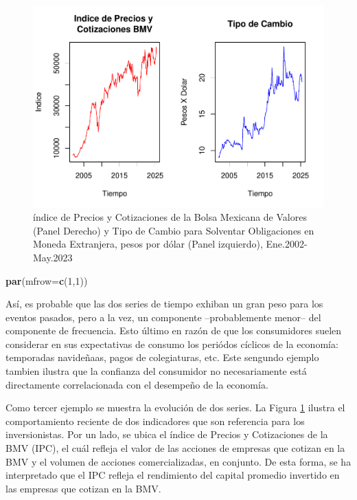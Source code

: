 \documentclass[
]{book}
\newenvironment{Shaded}{\begin{snugshade}}{\end{snugshade}}
\newcommand{\AttributeTok}[1]{\textcolor[rgb]{0.13,0.29,0.53}{#1}}
\newcommand{\DecValTok}[1]{\textcolor[rgb]{0.00,0.00,0.81}{#1}}
\newcommand{\FunctionTok}[1]{\textcolor[rgb]{0.13,0.29,0.53}{\textbf{#1}}}
\newcommand{\NormalTok}[1]{#1}
\begin{document}
\begin{figure}

{\centering \includegraphics{Notas-Series-Tiempo_files/figure-latex/fig3-1} 

}

\caption{índice de Precios y Cotizaciones de la Bolsa Mexicana de Valores (Panel Derecho) y Tipo de Cambio para Solventar Obligaciones en Moneda Extranjera, pesos por dólar (Panel izquierdo), Ene.2002-May.2023}\label{fig:fig3}
\end{figure}

\begin{Shaded}
\begin{Highlighting}[]
\FunctionTok{par}\NormalTok{(}\AttributeTok{mfrow=}\FunctionTok{c}\NormalTok{(}\DecValTok{1}\NormalTok{,}\DecValTok{1}\NormalTok{))}
\end{Highlighting}
\end{Shaded}

Así, es probable que las dos series de tiempo exhiban un gran peso para los eventos pasados, pero a la vez, un componente --probablemente menor-- del componente de frecuencia. Esto último en razón de que los consumidores suelen considerar en sus expectativas de consumo los periódos cíclicos de la economía: temporadas navideñaas, pagos de colegiaturas, etc. Este sengundo ejemplo tambien ilustra que la confianza del consumidor no necesariamente está directamente correlacionada con el desempeño de la economía.

Como tercer ejemplo se muestra la evolución de dos series. La Figura \ref{fig:fig3} ilustra el comportamiento reciente de dos indicadores que son referencia para los inversionistas. Por un lado, se ubica el índice de Precios y Cotizaciones de la BMV (IPC), el cuál refleja el valor de las acciones de empresas que cotizan en la BMV y el volumen de acciones comercializadas, en conjunto. De esta forma, se ha interpretado que el IPC refleja el rendimiento del capital promedio invertido en las empresas que cotizan en la BMV.
\end{document}
